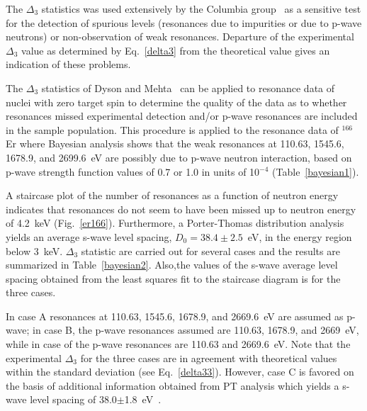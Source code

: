 \documentclass[twocolumn,amsmath,amssymb,10pt,groupedaddress,a4paper]{revtex4}
\begin{document}
The $\Delta_3$ statistics was used extensively by the Columbia group~\cite{liou:72} as a sensitive test for the detection of spurious levels (resonances due to impurities or due to p-wave neutrons) or non-observation of weak resonances. Departure of the experimental $\Delta_3$ value as determined by Eq.~\ref{delta3} from the theoretical value gives an indication of these problems.

The $\Delta_3$ statistics of Dyson and Mehta~\cite{dyson:63} can be applied to resonance data of nuclei  with zero target spin  to determine the quality of the data as to whether resonances missed experimental detection and/or p-wave resonances are included in the sample population. This procedure is applied to the resonance data of  $^{166}$Er  where Bayesian analysis shows that the weak resonances at 110.63, 1545.6, 1678.9, and 2699.6~eV are possibly  due to p-wave neutron interaction, based on  p-wave  strength function values of 0.7 or 1.0 in units of 10$^{-4}$  (Table~\ref{bayesian1}).

A staircase plot of the number of resonances as a function of neutron energy indicates that resonances do not seem to have been missed up to neutron energy of 4.2~keV (Fig.~\ref{er166}). Furthermore, a Porter-Thomas distribution analysis  yields an average s-wave level spacing, $D_0=38.4 \pm 2.5$~eV, in the energy region below 3~keV. $\Delta_3$ statistic are carried out for several cases and the results are summarized in Table~\ref{bayesian2}. Also,the values of the s-wave average level spacing obtained from the least squares fit to the staircase diagram is for the three cases.

In case A resonances at  110.63, 1545.6, 1678.9, and 2669.6~eV are assumed as p-wave; in case B, the p-wave resonances assumed are 110.63, 1678.9, and 2669~eV, while in case of the p-wave resonances are 110.63 and 2669.6~eV. Note that the experimental $\Delta_3$  for the three cases are in agreement with theoretical values within the standard deviation (see Eq.~\ref{delta33}). However, case C is favored on the basis of additional information obtained from PT analysis which yields a s-wave level spacing  of 38.0$\pm$1.8~eV~\cite{Mughabghab:06}.
\end{document}
